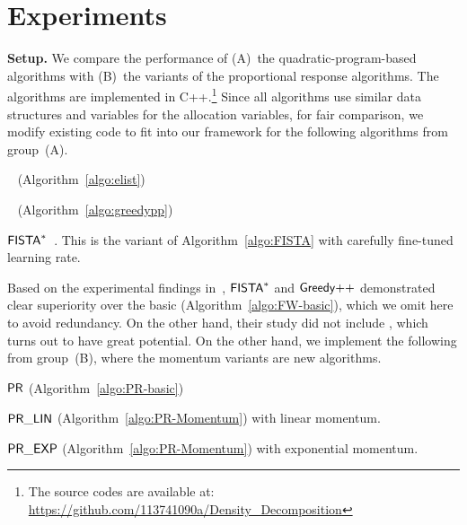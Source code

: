 \section{Experiments}
\label{sec:experiments}




\noindent \textbf{Setup.} We compare the performance of 
(A)~the quadratic-program-based algorithms
with (B)~the variants of the proportional response algorithms.
The algorithms are implemented in C++.\footnote{The
source codes are available at:
\url{https://github.com/113741090a/Density_Decomposition}}
Since all algorithms use similar data structures and
variables for the allocation variables, for fair comparison, 
we modify existing code to fit into our framework
for the following algorithms from group~(A).
\begin{compactitem}

\item \elist~\cite{DBLP:conf/www/DanischCS17,DBLP:journals/pvldb/SunDCS20} (Algorithm~\ref{algo:elist})

\item \greedypp~\cite{DBLP:conf/www/BoobGPSTWW20} (Algorithm~\ref{algo:greedypp})

\item $\mathsf{FISTA}^*$~\cite{DBLP:conf/nips/HarbQC22}. This is the variant of Algorithm~\ref{algo:FISTA}
with carefully fine-tuned learning rate.
\end{compactitem}

Based on the experimental findings in~\cite{DBLP:conf/nips/HarbQC22}, 
$\mathsf{FISTA}^*$ and $\mbox{\ensuremath{\mathsf{Greedy}}++}$ 
demonstrated clear superiority over the basic \fw (Algorithm~\ref{algo:FW-basic}),
which we omit here to avoid redundancy.
On the other hand, their study did not include \elist,
which turns out to have great potential.
On the other hand, we implement the following from group~(B),
where the momentum variants are new algorithms.
\begin{compactitem}

\item $\mathsf{PR}$  (Algorithm~\ref{algo:PR-basic})

\item $\mathsf{PR\_LIN}$  (Algorithm~\ref{algo:PR-Momentum}) with linear momentum.

\item $\mathsf{PR\_EXP}$  (Algorithm~\ref{algo:PR-Momentum}) with exponential
momentum.

\end{compactitem}






